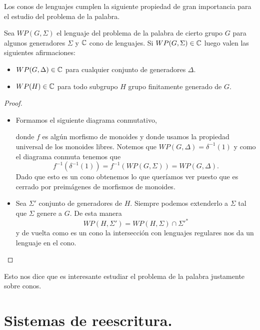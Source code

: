 \documentclass[tesis.tex]{subfiles}
\newcommand{\fg}{grupo finitamente generado }
\begin{document}
Los conos de lenguajes cumplen la siguiente propiedad de gran importancia para el estudio del problema de la palabra.
\medskip
\begin{prop}\label{prop-cono-wp}
	Sea $WP(G, \Sigma)$ el lenguaje del problema de la palabra de cierto grupo $G$ para algunos generadores $\Sigma$ y $\mathbb C$ cono de lenguajes. 
	Si $WP(G, \Sigma) \in \mathbb C$ luego valen las siguientes afirmaciones:
	\begin{itemize}
		\item $WP(G, \Delta) \in \mathbb C$ para cualquier conjunto de generadores $\Delta$.
		\item $WP(H) \in \mathbb C$ para todo subgrupo $H$ \fg de $G$.
	\end{itemize} 
\end{prop}
\begin{proof}
	\begin{itemize}
		\item 
		Formamos el siguiente diagrama conmutativo,
		\begin{center}
		\end{center}
		donde $f$ es algún morfismo de monoides y donde usamos la propiedad universal de los monoides libres.
		Notemos que $WP(G, \Delta) = \delta^{-1}(1)$ y como el diagrama conmuta tenemos que 
		\[
		f^{-1}(\delta^{-1}(1)) = f^{-1}(WP(G,\Sigma)) = WP(G, \Delta).
		\]
		Dado que esto es un cono obtenemos lo que queríamos ver puesto que es cerrado por preimágenes de morfismos de monoides.
		
		
		
		\item Sea $\Sigma'$ conjunto de generadores de $H$.
		Siempre podemos extenderlo a $\Sigma$ tal que $\Sigma$ genere a $G$. 
		De esta manera 
		\[
		WP(H, \Sigma') = WP(H, \Sigma) \cap \Sigma'^*
		\]
		y de vuelta como es un cono la intersección con lenguajes regulares nos da un lenguaje en el cono. 
	\end{itemize}
\end{proof}
\medskip
Esto nos dice que es interesante estudiar el problema de la palabra justamente sobre conos.


\section{Sistemas de reescritura.}
\end{document}
